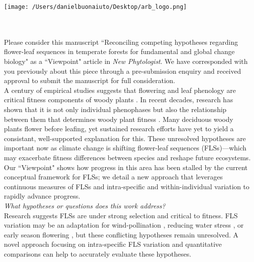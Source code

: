 \documentclass[11.5 pt]{article}\usepackage[]{graphicx}\usepackage[]{color}
\begin{document}

\def\labelitemi{--}
\parindent=24pt
\noindent\texttt{[image: /Users/danielbuonaiuto/Desktop/arb\_logo.png]}
\\\\
\\
\vspace{1.5ex}

\noindent Please consider this manuscript ``Reconciling competing hypotheses regarding flower-leaf sequences in temperate forests for fundamental and global change biology" as a ``Viewpoint" article in \textit{New Phytologist}. We have corresponded with you previously about this piece through a pre-submission enquiry and received approval to submit the manuscript for full consideration.\\

\noindent A century of empirical studies suggests that flowering and leaf phenology are critical fitness components of woody plants \citep{Munguia-Rosas2011,Forrest2010}. In recent decades, research has shown that it is not only individual phenophases but also the relationship between them that determines woody plant fitness \citep{Menzel1999,Ettinger2018}. Many deciduous woody plants flower before leafing, yet sustained research efforts have yet to yield a consistant, well-supported explanation for this. These unresolved hypotheses are important now as climate change is shifting flower-leaf sequences (FLSs)---which may exacerbate fitness differences between species and reshape future ecosystems. Our ``Viewpoint" shows how progress in this area has been stalled by the current conceptual framework for FLSs; we detail a new approach that leverages continuous measures of FLSs and intra-specific and within-individual variation to rapidly advance progress.\\

\noindent \emph{What hypotheses or questions does this work address?}\\
\noindent Research suggests FLSs are under strong selection and critical to fitness. FLS variation may be an adaptation for wind-pollination \citep{Rathcke_1985}, reducing water stress \citep{Gougherty2018,Reich1984}, or early season flowering \citep{Primack1987}, but these conflicting hypotheses remain unresolved. A novel approach focusing on intra-specific FLS variation and quantitative comparisons can help to accurately evaluate these hypotheses.\\
\end{document}
